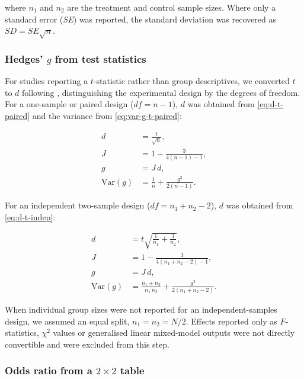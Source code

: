 \noindent where $n_{1}$ and $n_{2}$ are the treatment and control sample
sizes. Where only a standard error (\textit{SE}) was reported, the standard
deviation was recovered as $SD = SE\sqrt{n}$.

\subsubsection{Hedges' $g$ from test statistics}

For studies reporting a $t$-statistic rather than group descriptives, we
converted $t$ to $d$ following \citet{borensteinIntroductionMetaanalysis2011},
distinguishing the experimental design by the degrees of freedom. For a
one-sample or paired design ($\mathit{df} = n - 1$), $d$ was obtained from
\autoref{eq:d-t-paired} and the variance from \autoref{eq:var-g-t-paired}:

\begin{align}
  d          &= \frac{t}{\sqrt{n}}, \label{eq:d-t-paired} \\[4pt]
  J          &= 1 - \frac{3}{4(n-1) - 1}, \label{eq:J-t-paired} \\[4pt]
  g          &= J \, d, \label{eq:hedges-g-t-paired} \\[4pt]
  \mathrm{Var}(g) &= \frac{1}{n} + \frac{g^{2}}{2(n-1)}. \label{eq:var-g-t-paired}
\end{align}

\noindent For an independent two-sample design ($\mathit{df} = n_{1}+n_{2}-2$),
$d$ was obtained from \autoref{eq:d-t-indep}:

\begin{align}
  d          &= t \sqrt{\frac{1}{n_{1}} + \frac{1}{n_{2}}}, \label{eq:d-t-indep} \\[4pt]
  J          &= 1 - \frac{3}{4(n_{1}+n_{2}-2) - 1}, \label{eq:J-t-indep} \\[4pt]
  g          &= J \, d, \label{eq:hedges-g-t-indep} \\[4pt]
  \mathrm{Var}(g) &= \frac{n_{1}+n_{2}}{n_{1}\,n_{2}} + \frac{g^{2}}{2(n_{1}+n_{2}-2)}. \label{eq:var-g-t-indep}
\end{align}

\noindent When individual group sizes were not reported for an
independent-samples design, we assumed an equal split, $n_{1} = n_{2} = N/2$.
Effects reported only as $F$-statistics, $\chi^{2}$ values or generalised
linear mixed-model outputs were not directly convertible and were excluded
from this step.

\subsubsection{Odds ratio from a $2\times2$ table}


